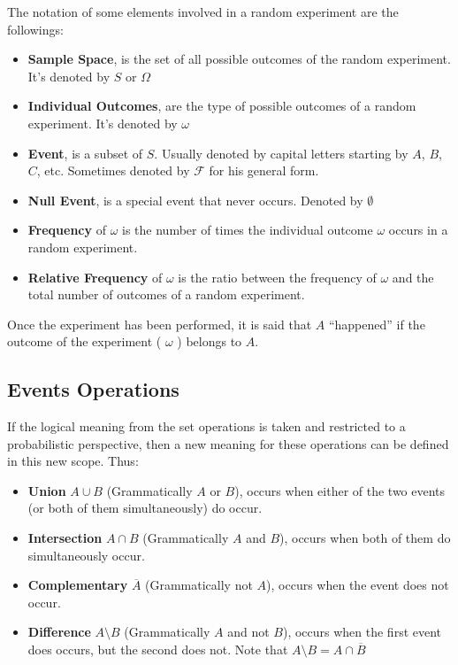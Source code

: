  The notation of some elements involved in a random experiment are the followings:
 \begin{itemize}
     \item \textbf{Sample Space}, is the set of all possible outcomes of the random experiment. It's denoted by $S$ or $\Omega$
     \item \textbf{Individual Outcomes}, are the type of possible outcomes of a random experiment. It's denoted by $\omega$
     \item \textbf{Event}, is a subset of $S$. Usually denoted by capital letters starting by $A$, $B$, $C$, etc. 
        Sometimes denoted by $\mathcal{F}$ for his general form. 
     \item \textbf{Null Event}, is a special event that never occurs. Denoted by $\emptyset$
     \item \textbf{Frequency} of $\omega$ is the number of times the individual outcome $\omega$ occurs in a random experiment.
     \item \textbf{Relative Frequency} of $\omega$ is the ratio between the frequency of $\omega$ and the total number of outcomes of a random experiment.
 \end{itemize}

 Once the experiment has been performed, it is said that $A$ “happened” if the outcome of the experiment ( $\omega$ ) belongs to $A$. 

 \subsection{Events Operations}
If the logical meaning from the set operations is taken and restricted to a probabilistic perspective, then a new meaning for these operations can be defined
in this new scope. Thus:
\begin{itemize}
    \item \textbf{Union} $A \cup B$ (Grammatically $A$ or $B$), occurs when either of the two events (or both of them simultaneously) do occur.
    \item \textbf{Intersection} $A \cap B$ (Grammatically $A$ and $B$), occurs when both of them do simultaneously occur.
    \item \textbf{Complementary} $\overline{A}$ (Grammatically not $A$), occurs when the event does not occur.
    \item \textbf{Difference} $A \setminus B$ (Grammatically $A$ and not $B$), occurs when the first event does occurs, but the second does not. 
                Note that $A \setminus B = A \cap \overline{B}$
\end{itemize}

